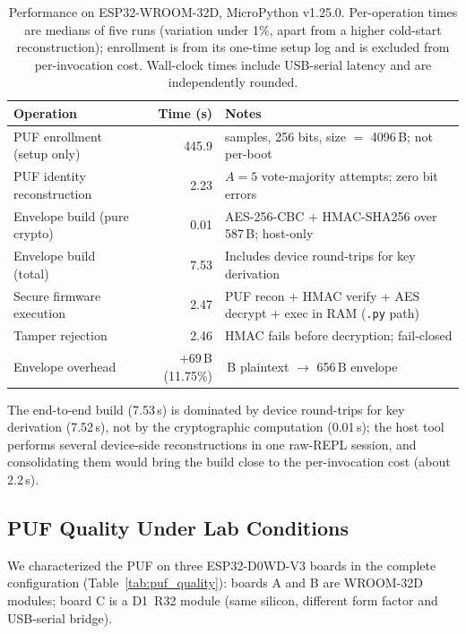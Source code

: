 \documentclass[runningheads]{llncs}
\begin{document}
\begin{table}[ht]
\caption{Performance on ESP32-WROOM-32D, MicroPython v1.25.0. Per-operation times are medians of five runs (variation under 1\%, apart from a higher cold-start reconstruction); enrollment is from its one-time setup log and is excluded from per-invocation cost. Wall-clock times include USB-serial latency and are independently rounded.}
\label{tab:timing}
\centering
\begin{tabularx}{\linewidth}{l r >{\raggedright\arraybackslash}X}
\toprule
Operation & Time (s) & Notes \\
\midrule
PUF enrollment (setup only) & 445.9
  & 1000 samples, 256 bits, size $=$ 4096\,B; not per-boot \\
\midrule
PUF identity reconstruction & 2.23
  & $A=5$ vote-majority attempts; zero bit errors \\
Envelope build (pure crypto)  & 0.01
  & AES-256-CBC + HMAC-SHA256 over 587\,B; host-only \\
Envelope build (total)        & 7.53
  & Includes device round-trips for key derivation \\
Secure firmware execution      & 2.47
  & PUF recon + HMAC verify + AES decrypt + exec in RAM (\texttt{.py} path) \\
Tamper rejection               & 2.46
  & HMAC fails before decryption; fail-closed \\
\midrule
Envelope overhead & $+69$\,B (11.75\%)
  & 587\,B plaintext $\to$ 656\,B envelope \\
\bottomrule
\end{tabularx}
\end{table}

The end-to-end build (7.53\,s) is dominated by device round-trips for key derivation (7.52\,s), not by the cryptographic computation (0.01\,s); the host tool performs several device-side reconstructions in one raw-REPL session, and consolidating them would bring the build close to the per-invocation cost (about 2.2\,s).

\subsection{PUF Quality Under Lab Conditions}

We characterized the PUF on three ESP32-D0WD-V3 boards in the complete configuration (Table~\ref{tab:puf_quality}): boards A and B are WROOM-32D modules; board C is a D1~R32 module (same silicon, different form factor and USB-serial bridge).
\end{document}
